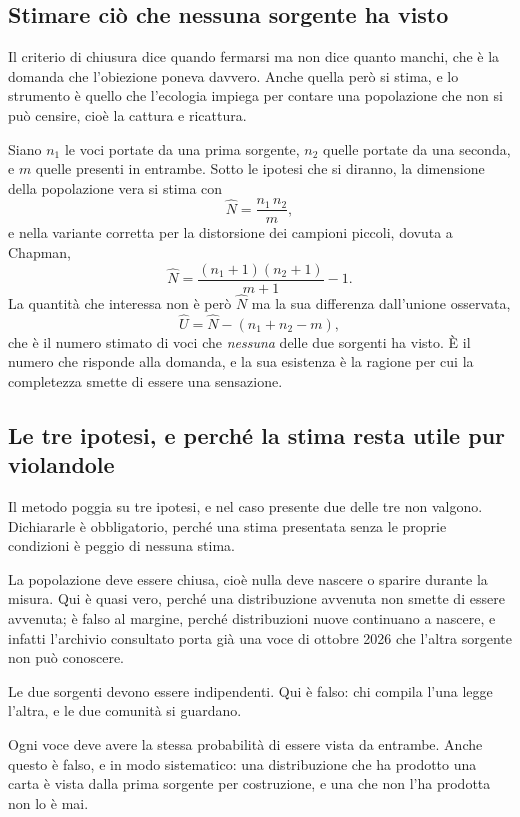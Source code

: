 \subsection{Stimare ciò che nessuna sorgente ha visto}

Il criterio di chiusura dice quando fermarsi ma non dice quanto manchi, che è la domanda che l'obiezione poneva davvero. Anche quella però si stima, e lo strumento è quello che l'ecologia impiega per contare una popolazione che non si può censire, cioè la cattura e ricattura.

Siano $n_1$ le voci portate da una prima sorgente, $n_2$ quelle portate da una seconda, e $m$ quelle presenti in entrambe. Sotto le ipotesi che si diranno, la dimensione della popolazione vera si stima con
\[
\hat{N} = \frac{n_1 \, n_2}{m},
\]
e nella variante corretta per la distorsione dei campioni piccoli, dovuta a Chapman,
\[
\hat{N} = \frac{(n_1+1)(n_2+1)}{m+1} - 1 .
\]
La quantità che interessa non è però $\hat{N}$ ma la sua differenza dall'unione osservata,
\[
\hat{U} = \hat{N} - \left( n_1 + n_2 - m \right),
\]
che è il numero stimato di voci che \emph{nessuna} delle due sorgenti ha visto. È il numero che risponde alla domanda, e la sua esistenza è la ragione per cui la completezza smette di essere una sensazione.

\subsection{Le tre ipotesi, e perché la stima resta utile pur violandole}

Il metodo poggia su tre ipotesi, e nel caso presente due delle tre non valgono. Dichiararle è obbligatorio, perché una stima presentata senza le proprie condizioni è peggio di nessuna stima.

La popolazione deve essere chiusa, cioè nulla deve nascere o sparire durante la misura. Qui è quasi vero, perché una distribuzione avvenuta non smette di essere avvenuta; è falso al margine, perché distribuzioni nuove continuano a nascere, e infatti l'archivio consultato porta già una voce di ottobre 2026 che l'altra sorgente non può conoscere.

Le due sorgenti devono essere indipendenti. Qui è falso: chi compila l'una legge l'altra, e le due comunità si guardano.

Ogni voce deve avere la stessa probabilità di essere vista da entrambe. Anche questo è falso, e in modo sistematico: una distribuzione che ha prodotto una carta è vista dalla prima sorgente per costruzione, e una che non l'ha prodotta non lo è mai.

